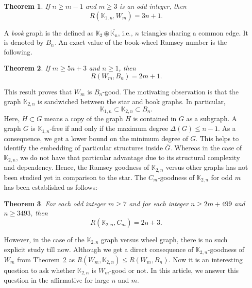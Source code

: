 \documentclass[reqno,10pt]{amsart}
\newtheorem{theorem}{Theorem}[section]
\theoremstyle{definition}
\begin{document}
\begin{theorem}\cite[Theorem~2]{MR2083456}
If $n\geq m-1$ and $m\geq 3$ is an odd integer, then 
\begin{equation*}
R(\mathbb{K}_{1,n},W_{m})=3n+1.
\end{equation*}
\end{theorem}

A \emph{book} graph is the defined as $\mathbb{K}_{2}\circledast \overline{\mathbb{K}_{n}}$, i.e., $n$ triangles sharing a common edge. It is denoted by $B_{n}$. An exact value of the book-wheel Ramsey number is the following.
\begin{theorem}\cite[Theorem~1]{MR1781297}\label{zhou}
If $m\geq 5n+3$ and $n\geq 1$, then
\begin{equation*}
 R(W_{m},B_{n})= 2m+1.
\end{equation*}
\end{theorem}
\noindent This result proves that $W_{m}$ is $B_{n}$-good. The motivating observation is that the graph $\mathbb{K}_{2,n}$ is sandwiched between the star and book graphs. In particular,
\begin{equation*}
\mathbb{K}_{1,n}\subset \mathbb{K}_{2,n}\subset B_{n}. 
\end{equation*}
Here, $H\subset G$ means a copy of the graph $H$ is contained in $G$ as a subgraph. A graph $G$ is $ \mathbb{K}_{1,n}$-free if and only if the maximum degree $\Delta(G)\leq n-1$. As a consequence, we get a lower bound on the minimum degree of $\overline{G}$. This helps to identify the embedding of particular structures inside $\overline{G}$. Whereas in the case of $\mathbb{K}_{2,n}$, we do not have that particular advantage due to its structural complexity and dependency. Hence, the Ramsey goodness of $\mathbb{K}_{2,n}$ versus other graphs has not been studied yet in comparison to the star. The $C_{m}$-goodness of $\mathbb{K}_{2,n}$ for odd $m$ has been established as follows:-  
\begin{theorem}\label{Our result}\cite[Theorem~1.8]{gupta2025study}
For each odd integer $m\geq 7$ and for each integer $n\geq2m+499$ and $n\geq 3493$, then 
\begin{equation*}
R(\mathbb{K}_{2,n},C_{m})= 2n+3. 
\end{equation*}
\end{theorem}
\noindent However, in the case of the $\mathbb{K}_{2,n}$ graph versus wheel graph, there is no such explicit study till now. Although we get a direct consequence of $\mathbb{K}_{2,n}$-goodness of $W_{m}$ from Theorem~\ref{zhou} as $ R(W_{m},\mathbb{K}_{2,n})\leq  R(W_{m},B_{n})$. Now it is an interesting question to ask whether $\mathbb{K}_{2,n}$ is $W_{m}$-good or not. In this article, we answer this question in the affirmative for large $n$ and $m$.
\end{document}
